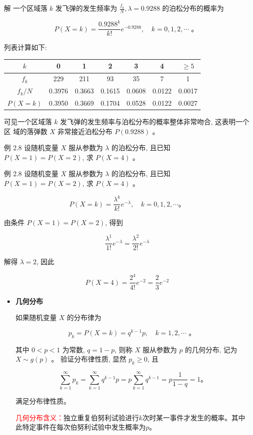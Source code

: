 \documentclass{beamer}
\newcommand{\new}[1]{\textcolor{red}{#1}}
\begin{document}
	\begin{frame}
		解 一个区域落 $k$ 发飞弹的发生频率为 $\frac{f_{k}}{N}, \lambda=0.9288$ 的泊松分布的概率为
		
		$$
		P(X=k)=\frac{0.9288^{k}}{k !} e^{-0.9288}, \quad k=0,1,2, \cdots \text { 。 }
		$$
		
		列表计算如下:
		\begin{tabular}{c|cccccc}
			\(k\) & 0 & 1 & 2 & 3 & 4 & \(\geqslant 5\) \\
			\hline
			\(f_{k}\) & 229 & 211 & 93 & 35 & 7 & 1 \\
			\(f_{k} / N\) & 0.3976 & 0.3663 & 0.1615 & 0.0608 & 0.0122 & 0.0017 \\
			\(P(X=k)\) & 0.3950 & 0.3669 & 0.1704 & 0.0528 & 0.0122 & 0.0027 \\
		\end{tabular}
		
		可见一个区域落 $k$ 发飞弹的发生频率与泊松分布的概率整体非常吻合, 这表明一个区 域的落弹数 $X$ 非常接近泊松分布 $P(0.9288)$ 。
	\end{frame}
	
	\begin{frame}
		例 2.8 设随机变量 $X$ 服从参数为 $\lambda$ 的泊松分布, 且已知 $P(X=1)=P(X=2)$, 求 $P(X=4)$ 。
	\end{frame}
	
	\begin{frame}
		例 2.8 设随机变量 $X$ 服从参数为 $\lambda$ 的泊松分布, 且已知 $P(X=1)=P(X=2)$, 求 $P(X=4)$ 。
		
		$$
		P(X=k)=\frac{\lambda^{k}}{k !} e^{-\lambda}, \quad k=0,1,2, \cdots 。
		$$
		
		由条件 $P(X=1)=P(X=2)$, 得到
		
		$$
		\frac{\lambda^{1}}{1 !} e^{-\lambda}=\frac{\lambda^{2}}{2 !} e^{-\lambda}
		$$
		
		解得 $\lambda=2$, 因此
		
		$$
		P(X=4)=\frac{2^{4}}{4 !} e^{-2}=\frac{2}{3} e^{-2}
		$$
	\end{frame}
	
	\begin{frame}
		\begin{itemize}
			\item \textbf{几何分布}
			
			如果随机变量 $X$ 的分布律为
			
			$$
			p_{k}=P(X=k)=q^{k-1} p, \quad k=1,2, \cdots \text { 。 }
			$$
			
			其中 $0<p<1$ 为常数, $q=1-p$, 则称 $X$ 服从参数为 $p$ 的几何分布, 记为 $X \sim g(p)$ 。 验证分布律性质, 显然 $p_{k} \geqslant 0$, 且
			
			$$
			\sum_{k=1}^{\infty} p_{k}=\sum_{k=1}^{\infty} q^{k-1} p=p \sum_{k=1}^{\infty} q^{k-1}=p \frac{1}{1-q}=1 。
			$$
			
			满足分布律性质。
			
			\new{几何分布含义：}独立重复伯努利试验进行$k$次时某一事件才发生的概率。其中此特定事件在每次伯努利试验中发生概率为$p$。
		\end{itemize}
	\end{frame}
	
\end{document}
